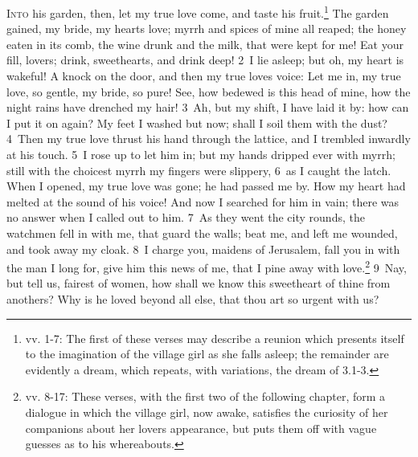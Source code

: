 \documentclass[10pt]{book} %
\begin{document}
\lettrine[lines=2]{I}{nto} his garden, then, let my true love come, and taste his fruit.\footnote[1]{vv. 1-7: The first of these verses may describe a reunion which presents itself to the imagination of the village girl as she falls asleep; the remainder are evidently a dream, which repeats, with variations, the dream of 3.1-3.} The garden gained, my bride, my heart\textquotesingle s love; myrrh and spices of mine all reaped; the honey eaten in its comb, the wine drunk and the milk, that were kept for me! Eat your fill, lovers; drink, sweethearts, and drink deep!
\textcolor{benred8}{2}~I lie asleep; but oh, my heart is wakeful! A knock on the door, and then my true love\textquotesingle s voice: Let me in, my true love, so gentle, my bride, so pure! See, how bedewed is this head of mine, how the night rains have drenched my hair! \textcolor{benred8}{3}~Ah, but my shift, I have laid it by: how can I put it on again? My feet I washed but now; shall I soil them with the dust? \textcolor{benred8}{4}~Then my true love thrust his hand through the lattice, and I trembled inwardly at his touch. \textcolor{benred8}{5}~I rose up to let him in; but my hands dripped ever with myrrh; still with the choicest myrrh my fingers were slippery, \textcolor{benred8}{6}~as I caught the latch. When I opened, my true love was gone; he had passed me by. How my heart had melted at the sound of his voice! And now I searched for him in vain; there was no answer when I called out to him. \textcolor{benred8}{7}~As they went the city rounds, the watchmen fell in with me, that guard the walls; beat me, and left me wounded, and took away my cloak. \textcolor{benred8}{8}~I charge you, maidens of Jerusalem, fall you in with the man I long for, give him this news of me, that I pine away with love.\footnote[2]{vv. 8-17: These verses, with the first two of the following chapter, form a dialogue in which the village girl, now awake, satisfies the curiosity of her companions about her lover\textquotesingle s appearance, but puts them off with vague guesses as to his whereabouts.}
\textcolor{benred8}{9}~Nay, but tell us, fairest of women, how shall we know this sweetheart of thine from another\textquotesingle s? Why is he loved beyond all else, that thou art so urgent with us?
\end{document}
